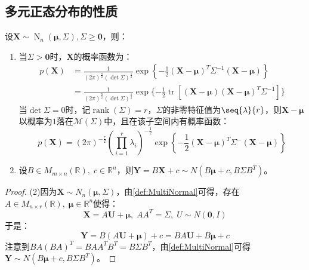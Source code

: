 \subsection{多元正态分布的性质}
\begin{property}\label{prop:MultiNormal}
	设$\mathbf{X}\sim\operatorname{N}_n(\boldsymbol{\mu},\Sigma),\Sigma\geqslant\mathbf{0}$，则：
	\begin{enumerate}
		\item 当$\Sigma>\mathbf{0}$时，$\mathbf{X}$的概率函数为：
		\begin{align*}
			p(\mathbf{X})&=\frac{1}{(2\pi)^{\frac{n}{2}}(\det\Sigma)^{\frac{1}{2}}}\exp\left\{-\frac{1}{2}(\mathbf{X}-\boldsymbol{\mu})^T\Sigma^{-1}(\mathbf{X}-\boldsymbol{\mu})\right\} \\
			&=\frac{1}{(2\pi)^{\frac{n}{2}}(\det\Sigma)^{\frac{1}{2}}}\exp\{-\frac{1}{2}\operatorname{tr}[(\mathbf{X}-\boldsymbol{\mu})(\mathbf{X}-\boldsymbol{\mu})^T\Sigma^{-1}]\}
		\end{align*}
		当$\det\Sigma=0$时，记$\operatorname{rank}(\Sigma)=r$，$\Sigma$的非零特征值为$\seq{\lambda}{r}$，则$\mathbf{X}-\boldsymbol{\mu}$以概率为$1$落在$\mathcal{M}(\Sigma)$中，且在该子空间内有概率函数：
		\begin{equation*}
			p(\mathbf{X})=(2\pi)^{-\frac{r}{2}}\left(\prod\limits_{i=1}^r\lambda_i\right)^{-\frac{1}{2}}\exp\left\{-\frac{1}{2}(\mathbf{X}-\boldsymbol{\mu})^T\Sigma^-(\mathbf{X}-\boldsymbol{\mu})\right\}
		\end{equation*}
		\item 设$B\in M_{m\times n}(\mathbb{R}),\;c\in\mathbb{R}^{n}$，则$\mathbf{Y}=B\mathbf{X}+c\sim N(B\boldsymbol{\mu}+c,B\Sigma B^T)$。
	\end{enumerate}
\end{property}
\begin{proof}
	(2)因为$\mathbf{X}\sim N_n(\boldsymbol{\mu},\Sigma)$，由\cref{def:MultiNormal}可得，存在$A\in M_{n\times r}(\mathbb{R}),\;\boldsymbol{\mu}\in\mathbb{R}^{n}$使得：
	\begin{equation*}
		\mathbf{X}=A\mathbf{U}+\boldsymbol{\mu},\;AA^T=\Sigma,\;U\sim N(\mathbf{0},I)
	\end{equation*}
	于是：
	\begin{equation*}
		\mathbf{Y}=B(A\mathbf{U}+\boldsymbol{\mu})+c=BA\mathbf{U}+B\boldsymbol{\mu}+c
	\end{equation*}
	注意到$BA(BA)^T=BAA^TB^T=B\Sigma B^T$，由\cref{def:MultiNormal}可得$\mathbf{Y}\sim N(B\boldsymbol{\mu}+c,B\Sigma B^T)$。
\end{proof}
